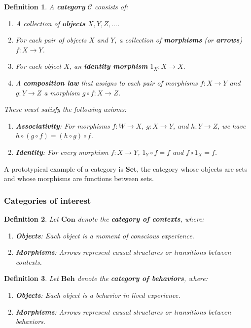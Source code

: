 \documentclass{article}
\newtheorem{definition}{Definition}[section]
\begin{document}
\begin{definition}
    A \textbf{category} $\mathcal{C}$ consists of:
    \begin{enumerate}[label=(\alph*)]
        \item A collection of \textbf{objects} $X, Y, Z, \dots$.
        \item For each pair of objects $X$ and $Y$, a collection of \textbf{morphisms} (or \textbf{arrows}) $f \colon X \to Y$.
        \item For each object $X$, an \textbf{identity morphism} $1_X \colon X \to X$.
        \item A \textbf{composition law} that assigns to each pair of morphisms $f \colon X \to Y$ and $g \colon Y \to Z$ a morphism $g \circ f \colon X \to Z$.
    \end{enumerate}
    These must satisfy the following axioms:
    \begin{enumerate}
        \item \textbf{Associativity}: For morphisms $f \colon W \to X$, $g \colon X \to Y$, and $h \colon Y \to Z$, we have $h \circ (g \circ f) = (h \circ g) \circ f$.
        \item \textbf{Identity}: For every morphism $f \colon X \to Y$, $1_Y \circ f = f$ and $f \circ 1_X = f$.
    \end{enumerate}
\end{definition}

A prototypical example of a category is $\mathbf{Set}$, the category whose objects are sets and whose morphisms are functions between sets.

\subsubsection{Categories of interest}
\begin{definition}
    Let $\mathbf{Con}$ denote the \textbf{category of contexts}, where:
    \begin{enumerate}
        \item \textbf{Objects}: Each object is a moment of conscious experience.
        \item \textbf{Morphisms}: Arrows represent causal structures or transitions between contexts.
    \end{enumerate}
\end{definition}

\begin{definition}
    Let $\mathbf{Beh}$ denote the \textbf{category of behaviors}, where:
    \begin{enumerate}
        \item \textbf{Objects}: Each object is a behavior in lived experience.
        \item \textbf{Morphisms}: Arrows represent causal structures or transitions between behaviors.
    \end{enumerate}
\end{definition}
\end{document}
